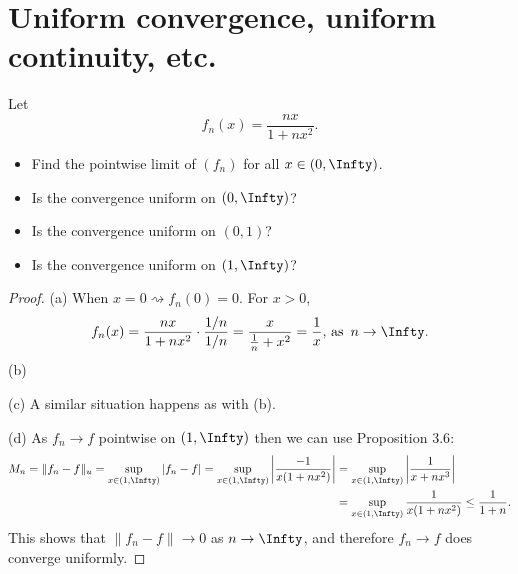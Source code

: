 \documentclass[oneside]{amsart}
\theoremstyle{definition}
\begin{document}
\newpage 

\section{Uniform convergence, uniform continuity, etc.}
\begin{tcolorbox}[colback=black!5!white,colframe=black!75!black,title= Exercise $5.1.$] Let $$f_n(x) = \frac{nx}{1+nx^2}.$$\label{ee: 5.1}
\begin{itemize}
	\item [(a)] Find the pointwise limit of $(f_n)$ for all $x \in ( 0, \Infty)$.
	\item [(b)] Is the convergence uniform on $(0, \Infty)$?
	\item [(c)] Is the convergence uniform on $(0,1)$?
	\item [(d)] Is the convergence uniform on $(1, \Infty)$?
\end{itemize}
\tcblower 
\begin{proof} (a) When $x= 0 \rightsquigarrow f_n(0) = 0$. For $x > 0$, 
\[
f_n (x) = \frac{nx}{1+nx^2} \cdot \frac{1/n}{1/n} = \frac{x}{\frac{1}{n}+x^2} = \frac{1}{x},  \, \textup{as } \, n \to \Infty.
\] (b) 

(c) A similar situation happens as with (b).

(d) As $f_n  \to f$ pointwise on $(1, \Infty )$ then we can use Proposition $3.6$: 
\begin{align*}
	M_n = \|f_n - f\|_u = \sup_{x \in (1, \Infty)} |f_n -f| = \sup_{ x \in (1, \Infty) } \left | \frac{-1}{x(1+nx^2) }\right| &= \sup_{ x \in (1, \Infty) } \left | \frac{1}{x+nx^3 }\right| \\ &= \sup_{ x \in (1, \Infty)} \frac{1}{x(1+nx^2) } \leq \frac{1}{1+n}.
\end{align*}
This shows that $\|f_n -f \| \to 0 $ as $n \to \Infty$, and therefore $f_n \to f$ does converge uniformly. 
\end{proof} 
\end{tcolorbox}
\end{document}
